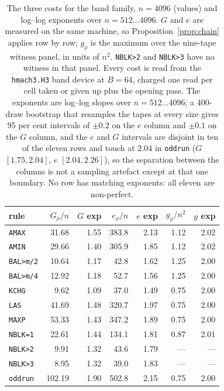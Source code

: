 \documentclass[11pt]{article}
\theoremstyle{remark}
\begin{document}
\begin{table}[H]
\centering
\small
\begin{tabular}{@{}lrrrrrr@{}}
\toprule
rule & $G_\rho/n$ & $G$ exp & $e_\rho/n$ & $e$ exp & $g_\rho/n^{2}$ & $g$ exp \\
\midrule
\texttt{AMAX}    & 31.68  & 1.55 & 383.8 & 2.13 & 1.12 & 2.02 \\
\texttt{AMIN}    & 29.66  & 1.40 & 305.9 & 1.85 & 1.12 & 2.02 \\
\texttt{BAL>m/2} & 10.64  & 1.17 & 42.8  & 1.62 & 1.25 & 2.00 \\
\texttt{BAL>m/4} & 12.92  & 1.18 & 52.7  & 1.56 & 1.25 & 2.00 \\
\texttt{KCHG}    &  9.62  & 1.09 & 37.0  & 1.49 & 0.75 & 2.00 \\
\texttt{LAS}     & 41.69  & 1.48 & 320.7 & 1.97 & 0.75 & 2.00 \\
\texttt{MAXP}    & 53.33  & 1.43 & 347.2 & 1.89 & 0.75 & 2.00 \\
\texttt{NBLK=1}  & 22.61  & 1.44 & 134.1 & 1.81 & 0.87 & 2.01 \\
\texttt{NBLK>2}  &  9.91  & 1.32 & 43.6  & 1.79 & ---  & ---  \\
\texttt{NBLK>3}  &  8.95  & 1.32 & 39.0  & 1.83 & ---  & ---  \\
\texttt{oddrun}  & 102.19 & 1.90 & 502.8 & 2.15 & 0.75 & 2.00 \\
\bottomrule
\end{tabular}
\caption{The three costs for the band family, $n=4096$ (values) and log--log exponents over
$n=512\ldots4096$.  $G$ and $e$ are measured on the same machine, so Proposition~\ref{prop:chain}
applies row by row; $g_\rho$ is the maximum over the nine-tape witness panel, in units of $n^{2}$.
\texttt{NBLK>2} and \texttt{NBLK>3} have no witness in that panel.  Every cost is read from the
\texttt{hmach3.H3} band device at $B=64$, charged one read per cell taken or given up plus the
opening pass.  The exponents are log--log slopes over $n=512\ldots4096$; a 400-draw bootstrap that
resamples the tapes at every size gives 95 per cent intervals of $\pm0.2$ on the $e$ column and
$\pm0.1$ on the $G$ column, and the $e$ and $G$ intervals are disjoint in ten of the eleven rows and touch at $2.04$ in \texttt{oddrun}
($G$ $[1.75,2.04]$, $e$ $[2.04,2.26]$), so the separation between the columns is not a sampling
artefact except at that one boundary.  No row has matching exponents:
all eleven are non-perfect.}
\label{tab:threecosts}
\end{table}
\end{document}
